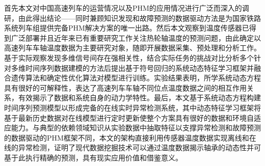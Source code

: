 首先本文对中国高速列车的运营情况以及PHM的应用情况进行广泛而深入的调研，由此得出结论——同时兼顾知识发现和故障预测的数据驱动方法是为国家铁路系统列车组提供完备PHM解决方案的唯一出路。然后本文观察到温度传感器已得到广泛部署并且近年来已有重要研究工作关注热轮轴温度的预测问题，由此确定以高速列车车轴温度数据为主要研究对象，随即开展数据采集、预处理和分析工作。基于实际观察发现多维信号间存在强相关性，结合实际任务的挑战对比分析多个针对多维时间序列数据建模的方法后提出基于符号回归的系统动态特征学习框架并融合遗传算法和确定性优化算法对模型进行训练。实验结果表明，所学系统动态方程具有很好的可解释性，表达了高速列车车轴不同位点温度数据之间的相互作用关系，有效揭示了数据和系统自身的动力学特性。最后，本文基于系统动态方程构建时间序列预测模型以形成完备的在线实时异常检测系统，其中动态特征学习框架将基于最新历史数据对在线模型进行定时更新使整个方案具有很好的数据和环境自适应能力。与典型的依赖领域知识从实验数据中抽取特征以支撑异常检测和故障预测的数据驱动的PHM框架不同，本文的架构直接利用传感器温度数据实现离线和在线的异常检测，证明了现代数据挖掘技术可以通过温度数据揭示轴承的动态性并可基于此执行精确的预测，具有现实应用价值和借鉴意义。


